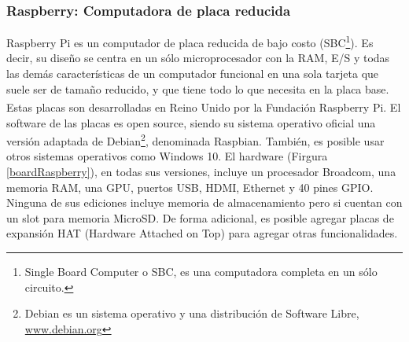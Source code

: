         \subsubsection{Raspberry: Computadora de placa reducida}
            \par Raspberry\textsuperscript{\textregistered} Pi es un computador de placa reducida de bajo costo (SBC\footnote{Single Board Computer o SBC, es una computadora completa en un sólo circuito.}). Es decir, su diseño se centra en un sólo microprocesador con la RAM, E/S y todas las demás características de un computador funcional en una sola tarjeta que suele ser de tamaño reducido, y que tiene todo lo que necesita en la placa base. Estas placas son desarrolladas en Reino Unido por la Fundación Raspberry\textsuperscript{\textregistered} Pi. El software de las placas es open source, siendo su sistema operativo oficial una versión adaptada de Debian\footnote{Debian es un sistema operativo y una distribución de Software Libre, \url{www.debian.org}}, denominada Raspbian. También, es posible usar otros sistemas operativos como Windows 10. El hardware (Firgura \ref{boardRaspberry}), en todas sus versiones, incluye un procesador Broadcom, una memoria RAM, una GPU, puertos USB, HDMI, Ethernet y 40 pines GPIO. Ninguna de sus ediciones incluye memoria de almacenamiento pero si cuentan con un slot para memoria MicroSD. De forma adicional, es posible agregar placas de expansión HAT (Hardware Attached on Top) para agregar otras funcionalidades.
            
